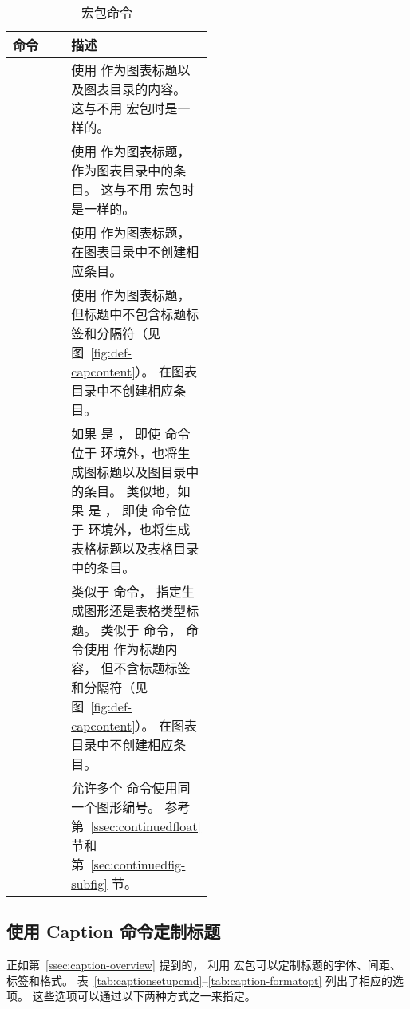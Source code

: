\begin{sidewaystable}
\centering
\caption{ 宏包命令}\label{tab:caption-cmd}
\begin{tabular}{l P{0.5\linewidth}}
	\toprule
	命令 & 描述 \\
	\midrule
	 & 
	使用  作为图表标题以及图表目录的内容。
	这与不用  宏包时是一样的。 \\
	 & 
	使用  作为图表标题， 作为图表目录中的条目。
	这与不用  宏包时是一样的。 \\
	 & 
	使用  作为图表标题，在图表目录中不创建相应条目。\\
	 & 
	使用  作为图表标题，但标题中不包含标题标签和分隔符（见图~\ref{fig:def-capcontent}）。
	在图表目录中不创建相应条目。\\
	 & 
	如果  是 ，
	即使  命令位于  环境外，也将生成图标题以及图目录中的条目。
	类似地，如果  是 ，
	即使  命令位于  环境外，也将生成表格标题以及表格目录中的条目。\\
	 &
	类似于  命令， 指定生成图形还是表格类型标题。
	类似于  命令， 命令使用  作为标题内容，
	但不含标题标签和分隔符（见图~\ref{fig:def-capcontent}）。
	在图表目录中不创建相应条目。\\
	 &
	允许多个  命令使用同一个图形编号。
	参考第~\ref{ssec:continuedfloat} 节和第~\ref{sec:continuedfig-subfig} 节。\\
	\bottomrule
\end{tabular}
\end{sidewaystable}


\subsection{使用 Caption 命令定制标题} \label{ssec:captioncmd}

正如第~\ref{ssec:caption-overview} 提到的，
利用  宏包可以定制标题的字体、间距、标签和格式。
表~\ref{tab:captionsetupcmd}--\ref{tab:caption-formatopt} 列出了相应的选项。
这些选项可以通过以下两种方式之一来指定。

